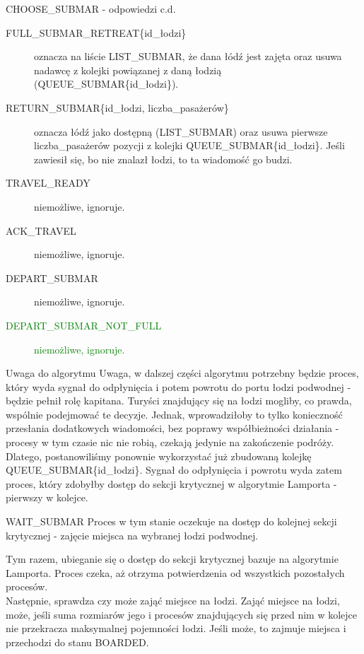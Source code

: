 \documentclass{beamer}
\begin{document}
\begin{frame}{CHOOSE\_SUBMAR - odpowiedzi c.d.}
    \internallinenumbers
    \resetlinenumber[1]
    \begin{description}
        \item [FULL\_SUBMAR\_RETREAT\{id\_łodzi\}] oznacza na liście LIST\_SUBMAR, że dana łódź jest zajęta oraz usuwa nadawcę z kolejki powiązanej z daną łodzią (QUEUE\_SUBMAR\{id\_łodzi\}).
        \item [RETURN\_SUBMAR\{id\_łodzi, liczba\_pasażerów\}] oznacza łódź jako dostępną (LIST\_SUBMAR) oraz usuwa pierwsze liczba\_pasażerów pozycji z kolejki QUEUE\_SUBMAR\{id\_łodzi\}. Jeśli zawiesił się, bo nie znalazł łodzi, to ta wiadomość go budzi.
        \item [TRAVEL\_READY] niemożliwe, ignoruje.
        \item [ACK\_TRAVEL] niemożliwe, ignoruje.
        \item [DEPART\_SUBMAR] niemożliwe, ignoruje.
        \item [\textcolor{green}{DEPART\_SUBMAR\_NOT\_FULL}] \textcolor{green}{niemożliwe, ignoruje.}
    \end{description}
\end{frame}


\begin{frame}{Uwaga do algorytmu}
    \internallinenumbers
    \resetlinenumber[1]
    Uwaga, w dalszej części algorytmu potrzebny będzie proces, który wyda sygnał do odpłynięcia i potem powrotu do portu łodzi podwodnej - będzie pełnił rolę kapitana. Turyści znajdujący się na łodzi mogliby, co prawda, wspólnie podejmować te decyzje. Jednak, wprowadziłoby to tylko konieczność przesłania dodatkowych wiadomości, bez poprawy współbieżności działania - procesy w tym czasie nic nie robią, czekają jedynie na zakończenie podróży. Dlatego, postanowiliśmy ponownie wykorzystać już zbudowaną kolejkę QUEUE\_SUBMAR\{id\_łodzi\}. Sygnał do odpłynięcia i powrotu wyda zatem proces, który zdobyłby dostęp do sekcji krytycznej w algorytmie Lamporta - pierwszy w kolejce.
\end{frame}

\begin{frame}{WAIT\_SUBMAR}
    \internallinenumbers
    \resetlinenumber[1]
    Proces w tym stanie oczekuje na dostęp do kolejnej sekcji krytycznej - zajęcie miejsca na wybranej łodzi podwodnej.

    \vspace{0.4cm}
    Tym razem, ubieganie się o dostęp do sekcji krytycznej bazuje na algorytmie Lamporta. Proces czeka, aż otrzyma potwierdzenia od wszystkich pozostałych procesów. \\
    Następnie, sprawdza czy może zająć miejsce na łodzi. Zająć miejsce na łodzi, może, jeśli suma rozmiarów jego i procesów znajdujących się przed nim w kolejce nie przekracza maksymalnej pojemności łodzi. Jeśli może, to zajmuje miejsca i przechodzi do stanu BOARDED.
\end{frame}
\end{document}

